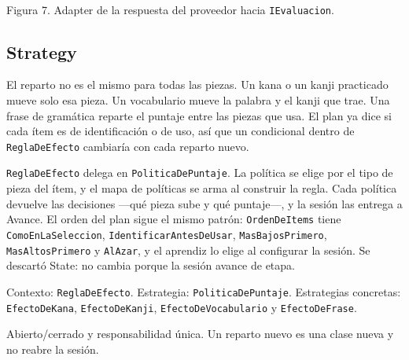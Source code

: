 \documentclass[11pt]{article}
\begin{document}
\begin{center}
\\[0.3em]
{\small Figura 7. Adapter de la respuesta del proveedor hacia \texttt{IEvaluacion}.}
\end{center}

\subsection{Strategy}

\begin{description}
  \raggedright
  \item[Problema.] El reparto no es el mismo para todas las piezas. Un kana o un kanji practicado mueve solo esa pieza. Un vocabulario mueve la palabra y el kanji que trae. Una frase de gramática reparte el puntaje entre las piezas que usa. El plan ya dice si cada ítem es de identificación o de uso, así que un condicional dentro de \texttt{ReglaDeEfecto} cambiaría con cada reparto nuevo.
  \item[Solución.] \texttt{ReglaDeEfecto} delega en \texttt{PoliticaDePuntaje}. La política se elige por el tipo de pieza del ítem, y el mapa de políticas se arma al construir la regla. Cada política devuelve las decisiones ---qué pieza sube y qué puntaje---, y la sesión las entrega a Avance. El orden del plan sigue el mismo patrón: \texttt{OrdenDeItems} tiene \texttt{ComoEnLaSeleccion}, \texttt{IdentificarAntesDeUsar}, \texttt{MasBajosPrimero}, \texttt{MasAltosPrimero} y \texttt{AlAzar}, y el aprendiz lo elige al configurar la sesión. Se descartó State: no cambia porque la sesión avance de etapa.
  \item[Participantes.] Contexto: \texttt{ReglaDeEfecto}. Estrategia: \texttt{PoliticaDePuntaje}. Estrategias concretas: \texttt{EfectoDeKana}, \texttt{EfectoDeKanji}, \texttt{EfectoDeVocabulario} y \texttt{EfectoDeFrase}.
  \item[SOLID.] Abierto/cerrado y responsabilidad única. Un reparto nuevo es una clase nueva y no reabre la sesión.
\end{description}
\end{document}
